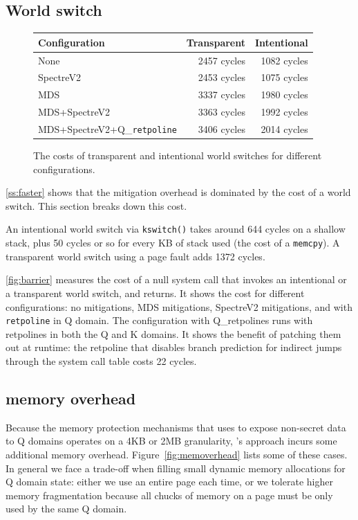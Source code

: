 \subsection{World switch}
\label{ss:world}

\begin{figure}
\small
\centering
\begin{tabular}{lrr}
  {\bf Configuration}
  & {\bf Transparent} & {\bf Intentional} \\
\midrule
None & 2457 cycles & 1082 cycles \\
SpectreV2 & 2453 cycles & 1075 cycles \\
MDS & 3337 cycles & 1980 cycles \\
MDS+SpectreV2 & 3363 cycles & 1992 cycles \\
MDS+SpectreV2+Q\_\texttt{retpoline} & 3406 cycles & 2014 cycles \\
\end{tabular}
\caption{The costs of transparent and intentional world switches for
  different configurations.}
\label{fig:barrier}
\end{figure}

\autoref{ss:faster} shows that the mitigation overhead is dominated by
the cost of a world switch.  This section breaks down this cost.

An intentional world switch via \texttt{kswitch()} takes around 644
cycles on a shallow stack, plus 50 cycles or so for every KB of stack
used (the cost of a \texttt{memcpy}). A transparent world switch using a page
fault adds 1372 cycles.

\autoref{fig:barrier} measures the cost of a null system call that
invokes an intentional or a transparent world switch, and returns.  It
shows the cost for different configurations: no mitigations, MDS
mitigations, SpectreV2 mitigations, and with \texttt{retpoline} in Q
domain.  The configuration with Q\_retpolines runs with retpolines
in both the Q and K domains. It shows the benefit of \sys patching
them out at runtime: the retpoline that disables branch prediction
for indirect jumps through the system call table costs 22 cycles.


\subsection{\sys memory overhead}
\label{ss:memoverhead}

Because the memory protection mechanisms that \sys uses to expose non-secret
data to Q domains operates on a 4KB or 2MB granularity, \sys's approach incurs
some additional memory overhead. Figure~\ref{fig:memoverhead} lists some of
these cases. In general we face a trade-off when filling small dynamic memory
allocations for Q domain state: either we use an entire page each time, or we
tolerate higher memory fragmentation because all chucks of memory on a page must
be only used by the same Q domain.

